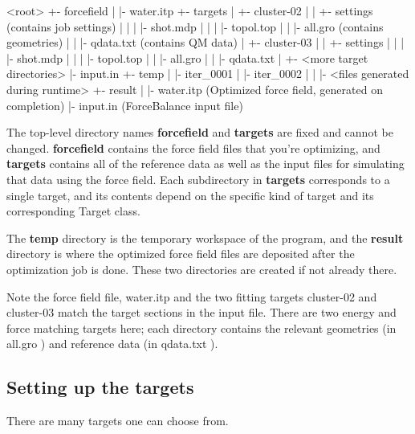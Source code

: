 \begin{DoxyVerb}
<root>
  +- forcefield
  |   |- water.itp
  +- targets
  |   +- cluster-02
  |   |   +- settings (contains job settings)
  |   |   |   |- shot.mdp
  |   |   |   |- topol.top
  |   |   |- all.gro (contains geometries)
  |   |   |- qdata.txt (contains QM data)
  |   +- cluster-03
  |   |   +- settings
  |   |   |   |- shot.mdp
  |   |   |   |- topol.top
  |   |   |- all.gro
  |   |   |- qdata.txt
  |   +- <more target directories>
  |- input.in
  +- temp
  |   |- iter_0001
  |   |- iter_0002
  |   |   |- <files generated during runtime>
  +- result
  |   |- water.itp (Optimized force field, generated on completion)
  |- input.in (ForceBalance input file)
\end{DoxyVerb}


\-The top-\/level directory names {\bfseries forcefield} and {\bfseries targets} are fixed and cannot be changed. {\bfseries forcefield} contains the force field files that you're optimizing, and {\bfseries targets} contains all of the reference data as well as the input files for simulating that data using the force field. \-Each subdirectory in {\bfseries targets} corresponds to a single target, and its contents depend on the specific kind of target and its corresponding {\ttfamily \-Target} class.

\-The {\bfseries temp} directory is the temporary workspace of the program, and the {\bfseries result} directory is where the optimized force field files are deposited after the optimization job is done. \-These two directories are created if not already there.

\-Note the force field file, {\ttfamily water.\-itp} and the two fitting targets {\ttfamily cluster-\/02} and {\ttfamily cluster-\/03} match the {\ttfamily target} sections in the input file. \-There are two energy and force matching targets here; each directory contains the relevant geometries (in {\ttfamily all.\-gro} ) and reference data (in {\ttfamily qdata.\-txt} ).\hypertarget{usage_targets}{}\subsection{\-Setting up the targets}\label{usage_targets}
\-There are many targets one can choose from.

